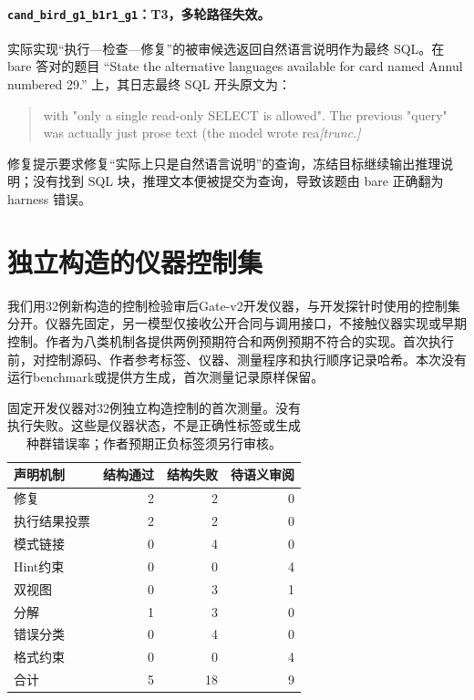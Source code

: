 \paragraph{\texttt{cand\_bird\_g1\_b1r1\_g1}：T3，多轮路径失效。}实际实现“执行—检查—修复”的被审候选返回自然语言说明作为最终 SQL。在 bare 答对的题目 ``State the alternative languages available for card named Annul numbered 29.'' 上，其日志最终 SQL 开头原文为：
\begin{quote}\small\ttfamily
with "only a single read-only SELECT is allowed". The previous "query" was actually just prose text (the model wrote rea\emph{[trunc.]}
\end{quote}
修复提示要求修复“实际上只是自然语言说明”的查询，冻结目标继续输出推理说明；没有找到 SQL 块，推理文本便被提交为查询，导致该题由 bare 正确翻为 harness 错误。

\section{独立构造的仪器控制集}\label{app:gatecontrols}
我们用32例新构造的控制检验审后Gate-v2开发仪器，与开发探针时使用的控制集分开。仪器先固定，另一模型仅接收公开合同与调用接口，不接触仪器实现或早期控制。作者为八类机制各提供两例预期符合和两例预期不符合的实现。首次执行前，对控制源码、作者参考标签、仪器、测量程序和执行顺序记录哈希。本次没有运行benchmark或提供方生成，首次测量记录原样保留。

\begin{table}[h]
\centering\small
\begin{tabular}{lrrr}\toprule
声明机制 & 结构通过 & 结构失败 & 待语义审阅 \\\midrule
修复 & 2 & 2 & 0 \\
执行结果投票 & 2 & 2 & 0 \\
模式链接 & 0 & 4 & 0 \\
Hint约束 & 0 & 0 & 4 \\
双视图 & 0 & 3 & 1 \\
分解 & 1 & 3 & 0 \\
错误分类 & 0 & 4 & 0 \\
格式约束 & 0 & 0 & 4 \\\midrule
合计 & 5 & 18 & 9 \\\bottomrule
\end{tabular}
\caption{固定开发仪器对32例独立构造控制的首次测量。没有执行失败。这些是仪器状态，不是正确性标签或生成种群错误率；作者预期正负标签须另行审核。}\label{tab:gatecontrols}
\end{table}

